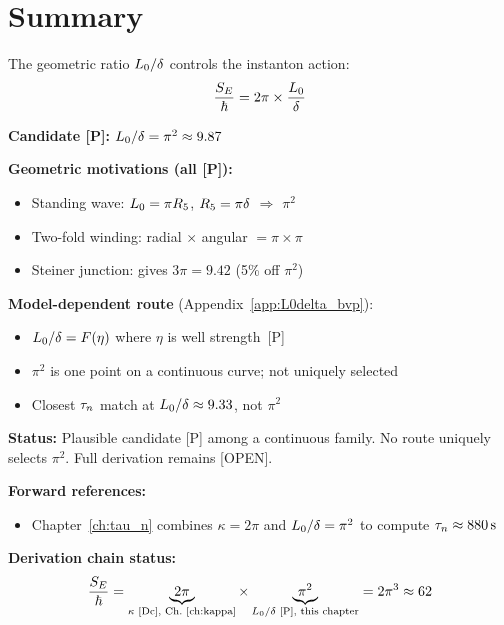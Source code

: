 \section{Summary}
\label{sec:L0delta:summary}

\begin{resultbox}
    The geometric ratio $L_0/\delta$ controls the instanton action:
    \begin{equation*}
        \frac{S_E}{\hbar} = 2\pi \times \frac{L_0}{\delta}
    \end{equation*}

    \textbf{Candidate [P]:} $L_0/\delta = \pi^2 \approx 9.87$

    \textbf{Geometric motivations (all [P]):}
    \begin{itemize}
        \item Standing wave: $L_0 = \pi R_5$, $R_5 = \pi\delta$ $\Rightarrow$ $\pi^2$
        \item Two-fold winding: radial $\times$ angular $= \pi \times \pi$
        \item Steiner junction: gives $3\pi = 9.42$ (5\% off $\pi^2$)
    \end{itemize}

    \textbf{Model-dependent route} (Appendix~\ref{app:L0delta_bvp}):
    \begin{itemize}
        \item $L_0/\delta = F(\eta)$ where $\eta$ is well strength~[P]
        \item $\pi^2$ is one point on a continuous curve; not uniquely selected
        \item Closest $\tau_n$ match at $L_0/\delta \approx 9.33$, not $\pi^2$
    \end{itemize}

    \textbf{Status:} Plausible candidate [P] among a continuous family.
    No route uniquely selects $\pi^2$. Full derivation remains [OPEN].
\end{resultbox}

\bigskip
\noindent
\textbf{Forward references:}
\begin{itemize}
    \item Chapter~\ref{ch:tau_n} combines $\kappa = 2\pi$ and $L_0/\delta = \pi^2$
          to compute $\tau_n \approx 880\,\mathrm{s}$
\end{itemize}

\bigskip
\noindent
\textbf{Derivation chain status:}
\begin{equation*}
    \frac{S_E}{\hbar} = \underbrace{2\pi}_{\kappa \text{ [Dc], Ch.~\ref{ch:kappa}}}
              \times \underbrace{\pi^2}_{L_0/\delta \text{ [P], this chapter}}
              = 2\pi^3 \approx 62
\end{equation*}

